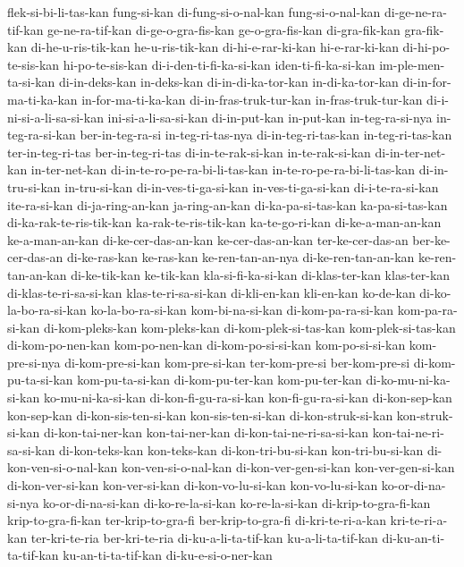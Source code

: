 {flek-si-bi-li-tas-kan fung-si-kan di-fung-si-o-nal-kan fung-si-o-nal-kan di-ge-ne-ra-tif-kan ge-ne-ra-tif-kan di-ge-o-gra-fis-kan ge-o-gra-fis-kan
di-gra-fik-kan gra-fik-kan di-he-u-ris-tik-kan he-u-ris-tik-kan di-hi-e-rar-ki-kan hi-e-rar-ki-kan di-hi-po-te-sis-kan hi-po-te-sis-kan
di-i-den-ti-fi-ka-si-kan iden-ti-fi-ka-si-kan im-ple-men-ta-si-kan di-in-deks-kan in-deks-kan di-in-di-ka-tor-kan in-di-ka-tor-kan di-in-for-ma-ti-ka-kan
in-for-ma-ti-ka-kan di-in-fras-truk-tur-kan in-fras-truk-tur-kan di-i-ni-si-a-li-sa-si-kan ini-si-a-li-sa-si-kan di-in-put-kan in-put-kan in-teg-ra-si-nya
in-teg-ra-si-kan ber-in-teg-ra-si in-teg-ri-tas-nya di-in-teg-ri-tas-kan in-teg-ri-tas-kan ter-in-teg-ri-tas ber-in-teg-ri-tas di-in-te-rak-si-kan
in-te-rak-si-kan di-in-ter-net-kan in-ter-net-kan di-in-te-ro-pe-ra-bi-li-tas-kan in-te-ro-pe-ra-bi-li-tas-kan di-in-tru-si-kan in-tru-si-kan di-in-ves-ti-ga-si-kan
in-ves-ti-ga-si-kan di-i-te-ra-si-kan ite-ra-si-kan di-ja-ring-an-kan ja-ring-an-kan di-ka-pa-si-tas-kan ka-pa-si-tas-kan di-ka-rak-te-ris-tik-kan
ka-rak-te-ris-tik-kan ka-te-go-ri-kan di-ke-a-man-an-kan ke-a-man-an-kan di-ke-cer-das-an-kan ke-cer-das-an-kan ter-ke-cer-das-an ber-ke-cer-das-an
di-ke-ras-kan ke-ras-kan ke-ren-tan-an-nya di-ke-ren-tan-an-kan ke-ren-tan-an-kan di-ke-tik-kan ke-tik-kan kla-si-fi-ka-si-kan
di-klas-ter-kan klas-ter-kan di-klas-te-ri-sa-si-kan klas-te-ri-sa-si-kan di-kli-en-kan kli-en-kan ko-de-kan di-ko-la-bo-ra-si-kan
ko-la-bo-ra-si-kan kom-bi-na-si-kan di-kom-pa-ra-si-kan kom-pa-ra-si-kan di-kom-pleks-kan kom-pleks-kan di-kom-plek-si-tas-kan kom-plek-si-tas-kan
di-kom-po-nen-kan kom-po-nen-kan di-kom-po-si-si-kan kom-po-si-si-kan kom-pre-si-nya di-kom-pre-si-kan kom-pre-si-kan ter-kom-pre-si
ber-kom-pre-si di-kom-pu-ta-si-kan kom-pu-ta-si-kan di-kom-pu-ter-kan kom-pu-ter-kan di-ko-mu-ni-ka-si-kan ko-mu-ni-ka-si-kan di-kon-fi-gu-ra-si-kan
kon-fi-gu-ra-si-kan di-kon-sep-kan kon-sep-kan di-kon-sis-ten-si-kan kon-sis-ten-si-kan di-kon-struk-si-kan kon-struk-si-kan di-kon-tai-ner-kan
kon-tai-ner-kan di-kon-tai-ne-ri-sa-si-kan kon-tai-ne-ri-sa-si-kan di-kon-teks-kan kon-teks-kan di-kon-tri-bu-si-kan kon-tri-bu-si-kan di-kon-ven-si-o-nal-kan
kon-ven-si-o-nal-kan di-kon-ver-gen-si-kan kon-ver-gen-si-kan di-kon-ver-si-kan kon-ver-si-kan di-kon-vo-lu-si-kan kon-vo-lu-si-kan ko-or-di-na-si-nya
ko-or-di-na-si-kan di-ko-re-la-si-kan ko-re-la-si-kan di-krip-to-gra-fi-kan krip-to-gra-fi-kan ter-krip-to-gra-fi ber-krip-to-gra-fi di-kri-te-ri-a-kan
kri-te-ri-a-kan ter-kri-te-ria ber-kri-te-ria di-ku-a-li-ta-tif-kan ku-a-li-ta-tif-kan di-ku-an-ti-ta-tif-kan ku-an-ti-ta-tif-kan di-ku-e-si-o-ner-kan
}
